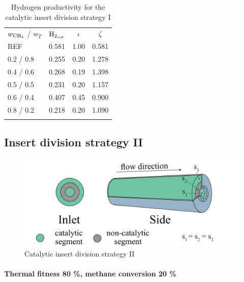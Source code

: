 \documentclass[preprint,12pt]{elsarticle}
\begin{document}
\begin{center}
\begin{table}
\centering
\caption{Hydrogen productivity for the catalytic insert division strategy I}
\label{tab:5RH2prod}
\begin{tabular}{l|c|c|c}
\hline\noalign{\smallskip}
 $w_{\rm{CH_4}}$ / $ w_T $ & $\rm{H_{2_{out}}}$ & $\iota$ & $\zeta$ \\
\noalign{\smallskip}\hline\noalign{\smallskip}
REF         & 0.581     & 1.00  &  0.581\\
0.2 / 0.8   & 0.255     & 0.20  & 1.278 \\
0.4 / 0.6   & 0.268     & 0.19  & 1.398 \\
0.5 / 0.5   & 0.231     & 0.20  & 1.157 \\
0.6 / 0.4   & 0.407     & 0.45  & 0.900 \\
0.8 / 0.2   & 0.218     & 0.20  & 1.090 \\
\noalign{\smallskip}\hline
\end{tabular}
\end{table}
\end{center}


\clearpage


\subsection{Insert division strategy II}
\label{subsec:5RE}

\begin{figure}[h!]
\centering
\includegraphics[width=120mm]{5segEqSurf.png}
\caption{\label{fig:5segEqSurf}Catalytic insert division strategy II}
\end{figure}


\paragraph{Thermal fitness 80 \%, methane conversion 20 \%} \hspace{0pt} \\
\noindent 
\end{document}
